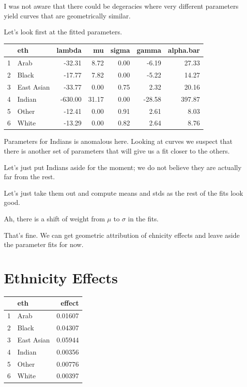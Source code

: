 \documentclass{amsart}
\begin{document}
I was not aware that there could be degeracies where very different parameters yield curves that are geometrically similar.  

Let's look first at the fitted parameters.

\begin{table}[ht]
\centering
\begin{tabular}{rlrrrrr}
  \hline
 & eth & lambda & mu & sigma & gamma & alpha.bar \\ 
  \hline
1 & Arab & -32.31 & 8.72 & 0.00 & -6.19 & 27.33 \\ 
  2 & Black & -17.77 & 7.82 & 0.00 & -5.22 & 14.27 \\ 
  3 & East Asian & -33.77 & 0.00 & 0.75 & 2.32 & 20.16 \\ 
  4 & Indian & -630.00 & 31.17 & 0.00 & -28.58 & 397.87 \\ 
  5 & Other & -12.41 & 0.00 & 0.91 & 2.61 & 8.03 \\ 
  6 & White & -13.29 & 0.00 & 0.82 & 2.64 & 8.76 \\ 
   \hline
\end{tabular}
\end{table}

Parameters for Indians is anomalous here.  Looking at curves we suspect that there is another set of parameters that will give us a fit closer to the others.

Let's just put Indians aside for the moment; we do not believe they are actually far from the rest.

Let's just take them out and compute means and stds as the rest of the fits look good.

Ah, there is a shift of weight from $\mu$ to $\sigma$ in the fits.


That's fine.  We can get geometric attribution of ehnicity effects and leave aside the parameter fits for now.

\section{Ethnicity Effects}

\begin{table}[ht]
\centering
\begin{tabular}{rlr}
  \hline
 & eth & effect \\ 
  \hline
1 & Arab & 0.01607 \\ 
  2 & Black & 0.04307 \\ 
  3 & East Asian & 0.05944 \\ 
  4 & Indian & 0.00356 \\ 
  5 & Other & 0.00776 \\ 
  6 & White & 0.00397 \\ 
   \hline
\end{tabular}
\end{table}
\end{document}
